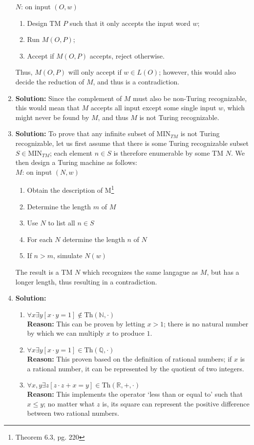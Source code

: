 \documentclass{article}
\begin{document}
\begin{enumerate}
    $N$: on input $(O, w)$ 
    \begin{enumerate}
        \item Design TM $P$ such that it only accepts the input word $w$;
        \item Run $M(O,P)$;
        \item Accept if $M(O,P)$ accepts, reject otherwise.
    \end{enumerate}
    Thus, $M(O,P)$ will only accept if $w \in L(O)$; however, this would also decide the reduction of $M$, and thus is a contradiction.
    \item \textbf{Solution:}
    Since the complement of $M$ must also be non-Turing recognizable, this would mean that $M$ accepts all input except some single input $w$, which might never be found by $M$, and thus $M$ is not Turing recognizable.
    \item \textbf{Solution:}
    To prove that any infinite subset of MIN$_{TM}$ is not Turing recognizable, let us first assume that there is some Turing recognizable subset $S \in \text{MIN}_{TM}$; each element $n \in S$ is therefore enumerable by some TM $N$. We then design a Turing machine as follows: \\

    $M$: on input $(N, w)$
    \begin{enumerate}
        \item Obtain the description of M\footnote{Theorem 6.3, pg. 220}
        \item Determine the length $m$ of $M$
        \item Use $N$ to list all $n \in S$
        \item For each $N$ determine the length $n$ of $N$
        \item If $n>m$, simulate $N(w)$
    \end{enumerate}
    The result is a TM $N$ which recognizes the same langague as $M$, but has a longer length, thus resulting in a contradiction.
    \item \textbf{Solution:}
    \begin{enumerate}
        \item $\forall x \exists y [x \cdot y = 1] \notin \text{Th}(\mathbb{N},\cdot)$ \\
        \textbf{Reason:} This can be proven by letting $x>1$; there is no natural number by which we can multiply $x$ to produce $1$.
        \item $\forall x \exists y [x \cdot y = 1] \in \text{Th}(\mathbb{Q},\cdot)$ \\
        \textbf{Reason:} This proven based on the definition of rational numbers; if $x$ is a rational number, it can be represented by the quotient of two integers. 
        \item $\forall x, y \exists z [z \cdot z + x = y] \in \text{Th}(\mathbb{R},+,\cdot)$ \\
        \textbf{Reason:} This implements the operator `less than or equal to' such that $x\leq y$; no matter what $z$ is, its square can represent the positive difference between two rational numbers.
    \end{enumerate}
\end{enumerate}
\end{document}
